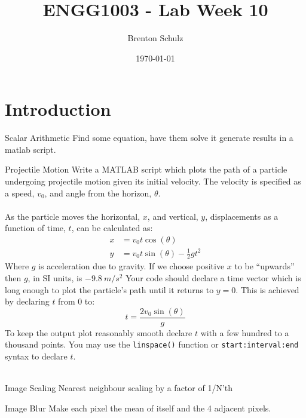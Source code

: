 \documentclass{lab}
\title{ENGG1003 - Lab Week 10}
\author{Brenton Schulz}
\date{\today}
\begin{document}
\maketitle

\section{Introduction}

\begin{task}{Scalar Arithmetic}{}
Find some equation, have them solve it generate results in a matlab script.
\end{task}

\begin{task}{Projectile Motion}{}
Write a MATLAB script which plots the path of a particle undergoing projectile motion given its initial velocity. The velocity is specified as a speed, $v_0$, and angle from the horizon, $\theta$.
\\~\\
As the particle moves the horizontal, $x$, and vertical, $y$, displacements as a function of time, $t$, can be calculated as:
\begin{align*}
x &= v_0 t \cos(\theta) \\
y &= v_0 t \sin(\theta) - \frac{1}{2}g t^2
\end{align*}
Where $g$ is acceleration due to gravity. If we choose positive $x$ to be ``upwards'' then $g$, in SI units, is $-9.8~{m/s^2}$
Your code should declare a time vector which is long enough to plot the particle's path until it returns to $y=0$. This is achieved by declaring $t$ from 0 to:
\begin{equation*}
t = \frac{2 v_0 \sin(\theta)}{g}
\end{equation*}
To keep the output plot reasonably smooth declare $t$ with a few hundred to a thousand points. You may use the \texttt{linspace()} function or \texttt{start:interval:end} syntax to declare $t$. 
\\~\\
\end{task}

\begin{task}{Image Scaling}{}
Nearest neighbour scaling by a factor of 1/N'th
\end{task}

\begin{task}{Image Blur}{}
Make each pixel the mean of itself and the 4 adjacent pixels. 
\end{task}
\end{document}
